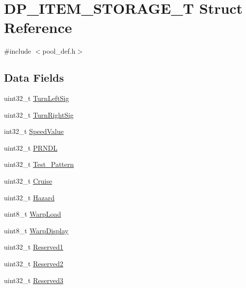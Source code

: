 \hypertarget{structDP__ITEM__STORAGE__T}{}\section{D\+P\+\_\+\+I\+T\+E\+M\+\_\+\+S\+T\+O\+R\+A\+G\+E\+\_\+T Struct Reference}
\label{structDP__ITEM__STORAGE__T}


{\ttfamily \#include $<$pool\+\_\+def.\+h$>$}

\subsection*{Data Fields}
\begin{DoxyCompactItemize}
\item 
uint32\+\_\+t \mbox{\hyperlink{structDP__ITEM__STORAGE__T_a1d43459e00d380f296b84d1908b331f5}{Turn\+Left\+Sig}}
\item 
uint32\+\_\+t \mbox{\hyperlink{structDP__ITEM__STORAGE__T_a2004ef7e77716da6d19b3c15f515da3b}{Turn\+Right\+Sig}}
\item 
int32\+\_\+t \mbox{\hyperlink{structDP__ITEM__STORAGE__T_a7180c12059ce1ea1569dbf2d37505d6f}{Speed\+Value}}
\item 
uint32\+\_\+t \mbox{\hyperlink{structDP__ITEM__STORAGE__T_ab52a34fcf3a0db379773f7c8b0dc4863}{P\+R\+N\+DL}}
\item 
uint32\+\_\+t \mbox{\hyperlink{structDP__ITEM__STORAGE__T_af2013625b8d2470cde6164602e4811df}{Test\+\_\+\+Pattern}}
\item 
uint32\+\_\+t \mbox{\hyperlink{structDP__ITEM__STORAGE__T_a706f853fc10095ae5f5cfbd50b2d17b8}{Cruise}}
\item 
uint32\+\_\+t \mbox{\hyperlink{structDP__ITEM__STORAGE__T_ad41e798d8e9cd05e7a17293d6d9ead9d}{Hazard}}
\item 
uint8\+\_\+t \mbox{\hyperlink{structDP__ITEM__STORAGE__T_aad65f4692fa504c0e4c2db30b365a6c4}{Warp\+Load}}
\item 
uint8\+\_\+t \mbox{\hyperlink{structDP__ITEM__STORAGE__T_a793bb0dd6431adc4625ee116e6b69ccb}{Warp\+Display}}
\item 
uint32\+\_\+t \mbox{\hyperlink{structDP__ITEM__STORAGE__T_a77a7812beab5d0f68ebc054fbaff853f}{Reserved1}}
\item 
uint32\+\_\+t \mbox{\hyperlink{structDP__ITEM__STORAGE__T_a7e7a01f1d0b097b44ffdb790156932b6}{Reserved2}}
\item 
uint32\+\_\+t \mbox{\hyperlink{structDP__ITEM__STORAGE__T_adddd1c8fdc541f26ed67f4772af01a8e}{Reserved3}}

\end{DoxyCompactItemize}

